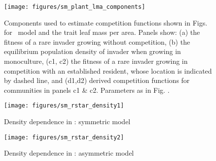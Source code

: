 \documentclass[10pt,twoside]{article}
\begin{document}
\begin{figure}[h]
 \centering
 \texttt{[image: figures/sm\_plant\_lma\_components]}
 \caption{Components used to estimate competition functions shown in Figs.
 {\figPlantLma} for \plant\ model and the trait leaf mass per area.
  Panels show: (a) the fitness of a rare invader growing without competition,
  (b) the equilibrium population density of invader when growing in monoculture,
  (c1, c2) the fitness of a rare invader growing in competition with an established
  resident, whose location is indicated by dashed line, and (d1,d2) derived competition
  functions for communities in panels  c1 \& c2. Parameters as in Fig.
  {\figPlantLma}.}
  \label{fig:sm_plant_lma_components}
\end{figure}

\begin{figure}[h]
  \centering
  \texttt{[image: figures/sm\_rstar\_density1]}
  \caption{Density dependence in \Rstar: symmetric model}
  \label{fig:rstar_density_dependence}
\end{figure}

\begin{figure}[h]
  \centering
  \texttt{[image: figures/sm\_rstar\_density2]}
  \caption{Density dependence in \Rstar: asymmetric model}
  \label{fig:rstar_density_dependence}
\end{figure}

% 
% 
\end{document}
